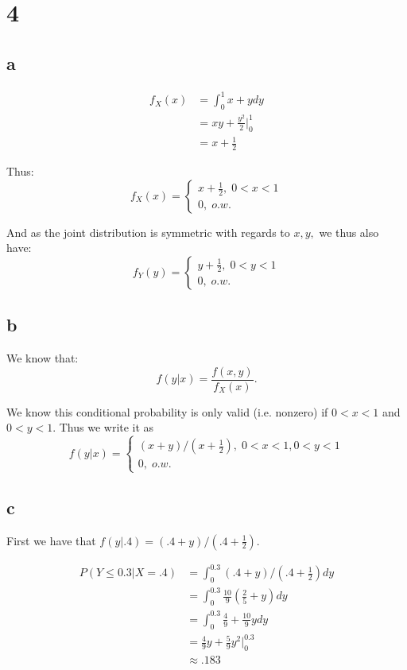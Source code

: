 \documentclass[10pt]{article}
\begin{document}
\section*{4}
\subsection*{a}
\begin{align*}
    f_X(x) &= \int_0^1 x+ydy\\
    &= xy + \frac{y^2}{2}\Bigr |_0^1\\
    &= x + \frac{1}{2}
\end{align*}

Thus:
\begin{equation*}
    f_X(x)=\begin{cases}
        x+\frac{1}{2},\;0<x<1\\
        0,\; o.w.
    \end{cases}
\end{equation*}

And as the joint distribution is symmetric with regards to $x,y,$ we thus also have:
\begin{equation*}
    f_Y(y)=\begin{cases}
        y+\frac{1}{2},\;0<y<1\\
        0,\; o.w.
    \end{cases}
\end{equation*}

\subsection*{b}
We know that:
 \[f(y|x)=\frac{f(x,y)}{f_X(x)}.\]

We know this conditional probability is only valid (i.e. nonzero) if $0<x<1$ and $0<y<1.$ Thus we write it as
\begin{equation*}
    f(y|x)=\begin{cases}
        (x+y)/(x+\frac{1}{2}),\;0<x<1,0<y<1\\
        0,\; o.w.
    \end{cases}
\end{equation*}

\subsection*{c}
First we have that $f(y|.4)=(.4+y)/(.4+\frac{1}{2}).$

\begin{align*}
    P(Y\le0.3|X=.4) &= \int_0^{0.3}(.4+y)/(.4+\frac{1}{2})dy\\
    &= \int_0^{0.3} \frac{10}{9}(\frac{2}{5}+y)dy\\
    &= \int_0^{0.3} \frac{4}{9} + \frac{10}{9}ydy\\
    &= \frac{4}{9}y +\frac{5}{9}y^2 \Bigr |_0^{0.3}\\
    &\approx .183 
\end{align*}
\end{document}
